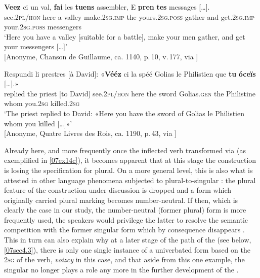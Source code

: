 \documentclass[output=paper,colorlinks,citecolor=brown]{langscibook}
\begin{document}
\begin{exe}
	\ex
	\begin{xlist}
		\ex \label{07ex15a} \gll \textbf{Veez} ci un val, \textbf{fai} les \textbf{tuens} assembler, E \textbf{pren} \textbf{tes} messages […]. \\
		see.\textsc{2pl/hon} here a valley make.\textsc{2sg.imp} the yours.\textsc{2sg.poss} gather and get.\textsc{2sg.imp} your.\textsc{2sg.poss} messengers \\
		\trans ‘Here you have a valley [suitable for a battle], make your men gather, and get your messengers […]’ \\
		\hfill [Anonyme, Chanson de Guillaume, ca. 1140, p. 10, v. 177, via \cite{bfm2019}]
		
		\ex \label{07ex15b} \gll Respundi li prestres [à David]: «\textbf{Vééz} ci la spéé Golias le Philistien que \textbf{tu} \textbf{óceïs} […].» \\
		replied the priest [to David] see.\textsc{2pl/hon} here the sword Golias.\textsc{gen} the Philistine whom you.\textsc{2sg} killed.\textsc{2sg} \\
		\trans ‘The priest replied to David: «Here you have the sword of Golias le Philistien whom you killed […]»’ \\
		\hfill [Anonyme, Quatre Livres des Rois, ca. 1190, p. 43, via \cite{bfm2019}]
	\end{xlist}
\end{exe}

Already here, and more frequently once the inflected verb transformed via  (as exemplified in \ref{07ex14c}), it becomes apparent that at this stage the   construction is losing the specification for plural. On a more general level, this is also what is attested in other language phenomena subjected to plural-to-singular : the plural feature of the construction under discussion is dropped and a form which originally carried plural marking becomes number-neutral. If then, which is clearly the case in our study, the number-neutral (former plural) form is more frequently used, the speakers would privilege the latter to resolve the semantic competition with the former singular form which by consequence disappears \citep[10]{batesmckenzie2021}. This in turn can also explain why at a later stage of the  path of the  (see below, \ref{07sec4.3}), there is only one single instance of a univerbated form based on the \textsc{2sg} of the verb, \emph{voizcy} in this case, and that aside from this one example, the singular no longer plays a role any more in the further development of the .
\end{document}

